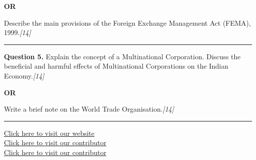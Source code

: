 \documentclass[11pt,a4paper]{article}
\newcommand{\pts}[1]{\hfill   \textit{[#1]}}
\begin{document}
\centerline{   \textbf{OR}}

Describe the main provisions of the Foreign Exchange Management Act (FEMA), 1999.\pts{14}

\medskip\rule{\linewidth}{0.2pt}




\noindent   \textbf{Question 5.}
Explain the concept of a Multinational Corporation. Discuss the beneficial and harmful effects of Multinational Corporations on the Indian Economy.\pts{14}

\centerline{   \textbf{OR}}

Write a brief note on the World Trade Organisation.\pts{14}

\vfill
\rule{\linewidth}{0.4pt}

\begin{center}\small
\href{https://bhu-exam.vercel.app/}{Click here to visit our website}\\[4pt]
\href{https://me-aryan.vercel.app/}{Click here to visit our contributor}\\[4pt]
\href{https://quashan-me.vercel.app/}{Click here to visit our contributor}
\end{center}
\end{document}
